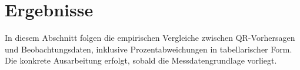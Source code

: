 \section{Ergebnisse}
In diesem Abschnitt folgen die empirischen Vergleiche zwischen QR-Vorhersagen
und Beobachtungsdaten, inklusive Prozentabweichungen in tabellarischer Form.
Die konkrete Ausarbeitung erfolgt, sobald die Messdatengrundlage vorliegt.
